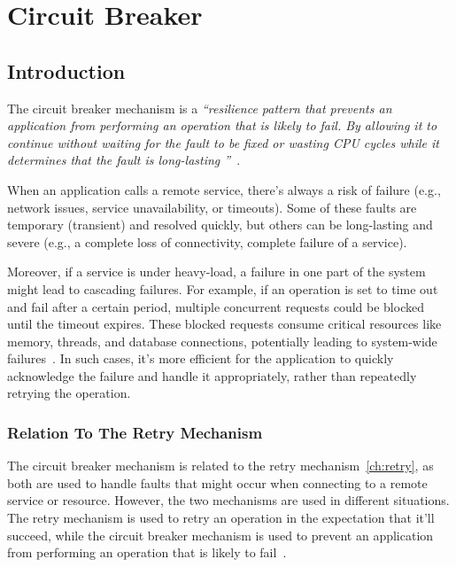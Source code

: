 \chapter{Circuit Breaker}\label{ch:circuit-breaker}


\section{Introduction}\label{sec:cbreaker-introduction}

The circuit breaker mechanism is a \textit{\enquote{resilience pattern
that prevents an application from performing an operation that is likely to fail.
By allowing it
to continue
without waiting for the fault to be fixed or wasting CPU cycles while it determines that the fault is long-lasting
}}~\cite{microsoft-cbreaker-pattern}.

When an application calls a remote service, there's always a risk of failure
(e.g., network issues, service unavailability, or timeouts).
Some of these faults are temporary (transient) and resolved quickly,
but others can be long-lasting and severe (e.g., a complete loss of connectivity, complete failure of a service).

Moreover, if a service is under heavy-load, a failure in one part of the system might lead to cascading failures.
For example, if an operation is set to time out and fail after a certain period, multiple concurrent requests could be blocked until the timeout expires.
These blocked requests consume critical resources like memory, threads, and database connections, potentially leading to system-wide failures~\cite{microsoft-cbreaker-pattern}.
In such cases, it’s more efficient for the application to quickly acknowledge the failure and handle it appropriately, rather than repeatedly retrying the operation.

\subsection{Relation To The Retry Mechanism}\label{subsec:cbreaker-relation-to-retry}

The circuit breaker mechanism is related to the retry mechanism~\ref{ch:retry}, as both are used to handle faults that might occur when connecting to a remote service or resource.
However, the two mechanisms are used in different situations.
The retry mechanism is used to retry an operation in the expectation that it'll succeed, while the circuit breaker mechanism is used to prevent an application from performing an operation that is likely to fail~\cite{microsoft-cbreaker-pattern}.

